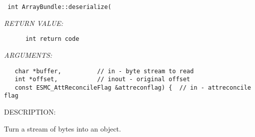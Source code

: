   
\begin{verbatim} int ArrayBundle::deserialize(\end{verbatim}{\em RETURN VALUE:}
\begin{verbatim}      int return code\end{verbatim}{\em ARGUMENTS:}
\begin{verbatim}   char *buffer,          // in - byte stream to read
   int *offset,           // inout - original offset
   const ESMC_AttReconcileFlag &attreconflag) {  // in - attreconcile flag\end{verbatim}
{\sf DESCRIPTION:\\ }


      Turn a stream of bytes into an object.
  
\setlength{\parskip}{\oldparskip}
\setlength{\parindent}{\oldparindent}
\setlength{\baselineskip}{\oldbaselineskip}

